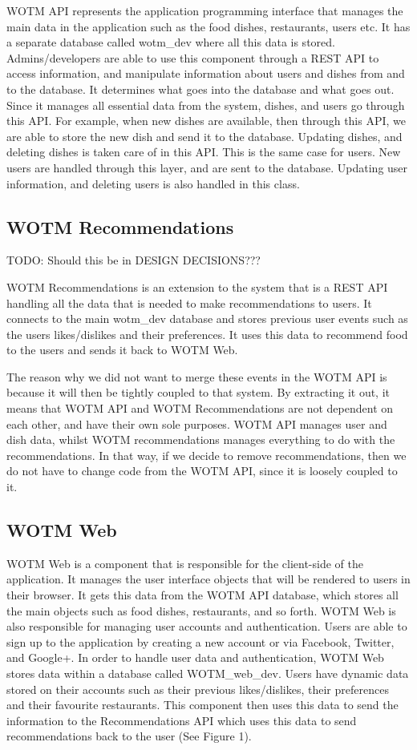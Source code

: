 WOTM API represents the application programming interface that manages the main data in the application such as the food dishes, restaurants, users etc. It has a separate database called wotm\_dev where all this data is stored. Admins/developers are able to use this component through a REST API to access information, and manipulate information about users and dishes from and to the database. It determines what goes into the database and what goes out. Since it manages all essential data from the system, dishes, and users go through this API. For example, when new dishes are available, then through this API, we are able to store the new dish and send it to the database. Updating dishes, and deleting dishes is taken care of in this API. This is the same case for users. New users are handled through this layer, and are sent to the database. Updating user information, and deleting users is also handled in this class.

\subsection{WOTM Recommendations}
TODO: Should this be in DESIGN DECISIONS???

WOTM Recommendations is an extension to the system that is a REST API handling all the data that is needed to make recommendations to users. It connects to the main wotm\_dev database and stores previous user events such as the users likes/dislikes and their preferences. It uses this data to recommend food to the users and sends it back to WOTM Web. 

The reason why we did not want to merge these events in the WOTM API is because it will then be tightly coupled to that system. By extracting it out, it means that WOTM API and WOTM Recommendations are not dependent on each other, and have their own sole purposes. WOTM API manages user and dish data, whilst WOTM recommendations manages everything to do with the recommendations. In that way, if we decide to remove recommendations, then we do not have to change code from the WOTM API, since it is loosely coupled to it. 

\subsection{WOTM Web}

WOTM Web is a component that is responsible for the client-side of the application. It manages the user interface objects that will be rendered to users in their browser. It gets this data from the WOTM API database, which stores all the main objects such as food dishes, restaurants, and so forth. WOTM Web is also responsible for managing user accounts and authentication. Users are able to sign up to the application by creating a new account or via Facebook, Twitter, and Google+. In order to handle user data and authentication, WOTM Web stores data within a database called WOTM\_web\_dev. Users have dynamic data stored on their accounts such as their previous likes/dislikes, their preferences and their favourite restaurants. This component then uses this data to send the information to the Recommendations API which uses this data to send recommendations back to the user (See Figure 1). 


